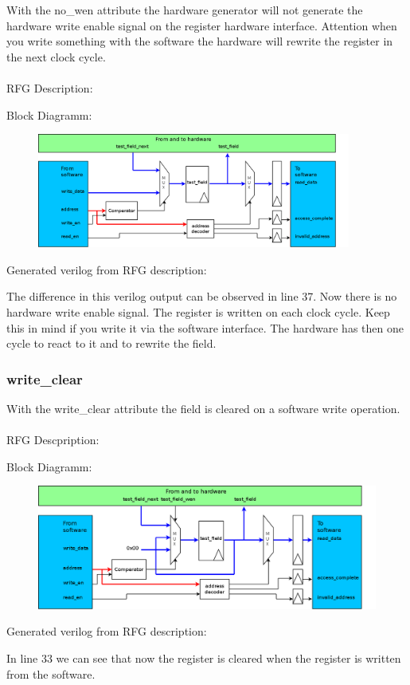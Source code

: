 \documentclass[12pt,a4paper]{article}
\begin{document}
With the no\_wen attribute the hardware generator will not generate the hardware write enable signal on the register hardware interface. Attention when you write something with the software the hardware will rewrite the register in the next clock cycle.\\
\\
RFG Description:


Block Diagramm:
\begin{figure}[h!]
\includegraphics[width=0.92\textwidth]{pictures/Reg_hrw_srw_nhwen.png}
\end{figure}
\newpage
Generated verilog from RFG description:

The difference in this verilog output can be observed in line 37. Now there is no hardware write enable signal. The register is written on each clock cycle. Keep this in mind if you write it via the software interface. The hardware has then one cycle to react to it and to rewrite the field.
\newpage

\subsubsection{write\_clear}
With the write\_clear attribute the field is cleared on a software write operation.\\
\\
RFG Descpription:


Block Diagramm:
\begin{figure}[h!]
    \includegraphics[width=\textwidth]{pictures/Reg_hrw_srw_swrite_clear.png}
\end{figure}
\newpage
Generated verilog from RFG description:

In line 33 we can see that now the register is cleared when the register is written from the software.
\newpage
\end{document}
